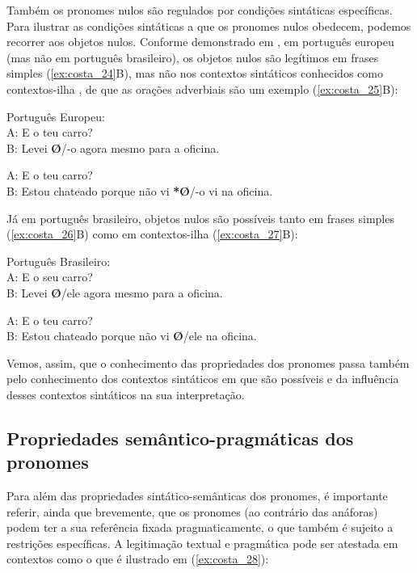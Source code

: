 \documentclass[output=paper]{LSP/langsci}
\begin{document}
Também os pronomes nulos são regulados por condições sintáticas específicas. Para ilustrar as condições sintáticas a que os pronomes nulos obedecem, podemos recorrer aos objetos nulos. Conforme demonstrado em \citet{raposo1986}, em português europeu (mas não em português brasileiro), os objetos nulos são legítimos em frases simples (\ref{ex:costa_24}B), mas não nos contextos sintáticos conhecidos como contextos-ilha \citep{ross1969}, de que as orações adverbiais são um exemplo (\ref{ex:costa_25}B):

\ea\label{ex:costa_24}
Português Europeu:\\
A: E o teu carro?\\
B: Levei \textbf{Ø}/-o agora mesmo para a oficina.
\z

\ea\label{ex:costa_25}
A: E o teu carro?\\
B: Estou chateado porque não vi \textbf{*Ø}/-o vi na oficina.
\z

Já em português brasileiro, objetos nulos são possíveis tanto em frases simples (\ref{ex:costa_26}B) como em contextos-ilha (\ref{ex:costa_27}B):

\ea\label{ex:costa_26}
Português Brasileiro:\\
A: E o seu carro?\\
B: Levei \textbf{Ø}/ele agora mesmo para a oficina.
\z

\ea\label{ex:costa_27}
A: E o teu carro?\\
B: Estou chateado porque não vi \textbf{Ø}/ele na oficina.
\z

Vemos, assim, que o conhecimento das propriedades dos pronomes passa também pelo conhecimento dos contextos sintáticos em que são possíveis e da influência desses contextos sintáticos na sua interpretação.

\subsection{Propriedades se\-mân\-ti\-co-prag\-má\-ti\-cas dos pronomes}
\label{subsec:costa_propriedades_sem_prag_pronomes}

Para além das propriedades sintático-semânticas dos pronomes, é importante referir, ainda que brevemente, que os pronomes (ao contrário das anáforas) podem ter a sua referência fixada pragmaticamente, o que também é sujeito a restrições específicas. A legitimação textual e pragmática pode ser atestada em contextos como o que é ilustrado em (\ref{ex:costa_28}):
\end{document}
